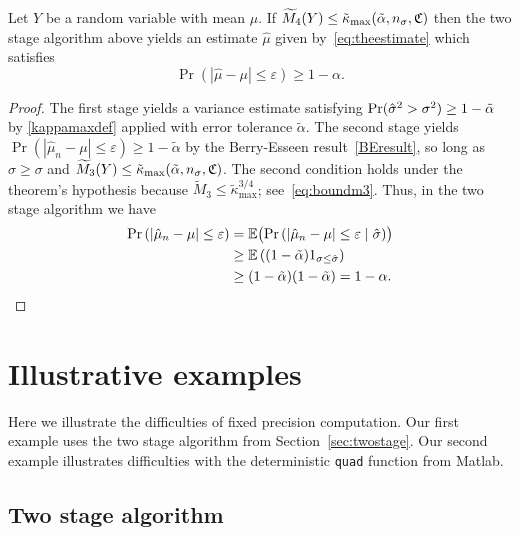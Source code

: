 \documentclass{article}
\begin{document}
\begin{theorem} \label{mainadaptthm} 
Let $Y$ be a random variable with mean $\mu$.
If $\widetilde M_4(Y) \le \tilde\kappa_{\max}(\tilde\alpha,n_\sigma,\mathfrak{C})$
then the two stage algorithm above yields an estimate
$\hat\mu$ given by~\eqref{eq:theestimate} which satisfies
$$\Pr( |\hat\mu-\mu|\le\varepsilon)\ge 1-\alpha.$$
\end{theorem}
\begin{proof} 
The first stage yields a variance estimate satisfying
$
\Pr( \hat\sigma^2 >\sigma^2)\ge 1-\tilde\alpha
$
by \eqref{kappamaxdef} applied with error tolerance $\tilde\alpha$.
The second stage yields
$\Pr( |\hat\mu_n-\mu|\le\varepsilon)\ge 1-\tilde\alpha$
by the Berry-Esseen result~\eqref{BEresult},
so long as $\hat\sigma\ge\sigma$
and $\widetilde M_3(Y)\le \tilde\kappa_{\max}(\tilde\alpha,n_\sigma,\mathfrak{C})$.
The second condition holds under the theorem's hypothesis
because $\widetilde{M}_3 \le \tilde\kappa_{\max}^{3/4}$;
see~\eqref{eq:boundm3}.
Thus, in the two stage algorithm we have
\begin{align*}
\Pr\left(\left|\hat{\mu}_n-\mu\right| \le \varepsilon \right) &
= \mathbb{E}\bigl(\Pr\left(\left|\hat{\mu}_n-\mu\right| \le \varepsilon \mid \hat\sigma \right) \bigr) \\
& \ge \mathbb{E}\left((1-\tilde\alpha) 1_{\sigma\le\hat\sigma}\right)\\
& \ge (1-\tilde\alpha) (1-\tilde\alpha) = 1-\alpha.\qedhere
\end{align*}
\end{proof}

\section{Illustrative examples}

Here we illustrate the difficulties of fixed precision
computation.  Our first example uses the two stage
algorithm from Section~\ref{sec:twostage}. 
Our second example illustrates difficulties with
the deterministic {\tt quad} function from Matlab.

\subsection{Two stage algorithm}
\end{document}
